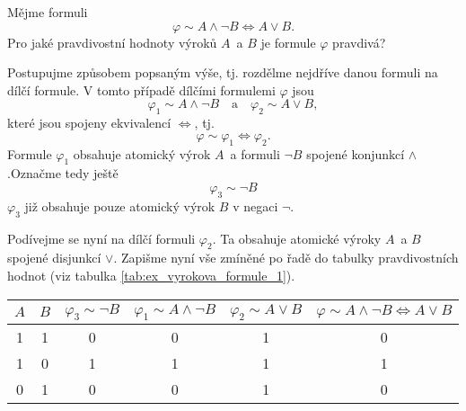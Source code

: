 \begin{example}\label{ex:vyrokova_formule_1}
    Mějme formuli
    \begin{equation*}
        \varphi\sim A \land \neg B \iff A \lor B.
    \end{equation*}
    Pro jaké pravdivostní hodnoty výroků $A$~a $B$ je formule $\varphi$ pravdivá?
    \begin{solution}
        Postupujme způsobem popsaným výše, tj. rozdělme nejdříve danou formuli na dílčí formule. V tomto případě dílčími formulemi $\varphi$ jsou
        \begin{equation*}
            \varphi_1\sim A \land \neg B \quad \text{a} \quad \varphi_2\sim A \lor B,
        \end{equation*}
        které jsou spojeny ekvivalencí $\iff$, tj.
        \begin{equation*}
            \varphi\sim \varphi_1 \iff \varphi_2.
        \end{equation*}
        Formule $\varphi_1$ obsahuje atomický výrok $A$~a formuli $\neg B$ spojené konjunkcí $\land$.\linebreak Označme tedy ještě
        \begin{equation*}
            \varphi_3\sim \neg B
        \end{equation*}
        $\varphi_3$ již obsahuje pouze atomický výrok $B$ v negaci $\neg$.\par
        Podívejme se nyní na dílčí formuli $\varphi_2$. Ta obsahuje atomické výroky $A$~a $B$ spojené disjunkcí $\lor$. Zapišme nyní vše zmíněné po řadě do tabulky pravdivostních hodnot (viz tabulka \ref{tab:ex_vyrokova_formule_1}).\par
        \begin{table}[H]
            \centering
            \begin{tabular}{|cc|cccc|}
            \hline
            $A$ & $B$ & $\varphi_3\sim \neg B$ & $\varphi_1\sim A \land \neg B$ & $\varphi_2\sim A \lor B$ & $\varphi\sim A \land \neg B \iff A \lor B$ \\ \hline
            1   & 1   & 0               & 0                          & 1                    & 0                                          \\
            1   & 0   & 1               & 1                          & 1                    & 1                                          \\
            0   & 1   & 0               & 0                          & 1                    & 0                                          \\

\end{tabular}
\end{table}
\end{solution}
\end{example}
